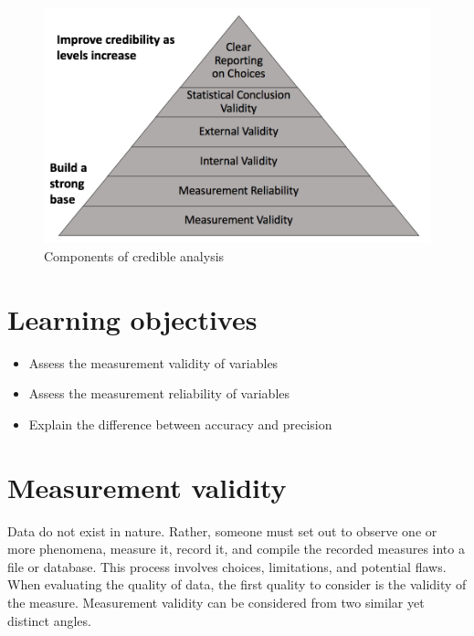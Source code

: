 \documentclass[
]{book}
\providecommand{\tightlist}{%
  \setlength{\itemsep}{0pt}\setlength{\parskip}{0pt}}
\begin{document}
\begin{figure}

{\centering \includegraphics[width=\textwidth]{images/credible} 

}

\caption{Components of credible analysis}\label{fig:credfig}
\end{figure}

\hypertarget{lo3}{%
\section{Learning objectives}\label{lo3}}

\begin{itemize}
\tightlist
\item
  Assess the measurement validity of variables
\item
  Assess the measurement reliability of variables
\item
  Explain the difference between accuracy and precision
\end{itemize}

\hypertarget{measurement-validity}{%
\section{Measurement validity}\label{measurement-validity}}

Data do not exist in nature. Rather, someone must set out to observe one or more phenomena, measure it, record it, and compile the recorded measures into a file or database. This process involves choices, limitations, and potential flaws. When evaluating the quality of data, the first quality to consider is the validity of the measure. Measurement validity can be considered from two similar yet distinct angles.
\end{document}
